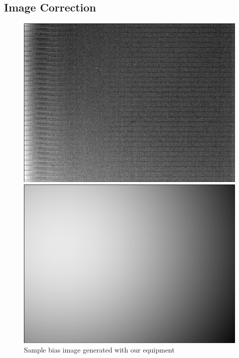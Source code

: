 \subsection{Image Correction}

\begin{figure}[ht]
    \centering
    \begin{minipage}[b]{\figwidth}
        \centering
        \includegraphics[width=\textwidth]{images/bias.png}
        \caption{Sample bias image generated with our equipment}
        \label{fig:bias_image}
    \end{minipage}\quad\quad
    \begin{minipage}[b]{\figwidth}
        \includegraphics[width=\textwidth]{images/flat.png}

\end{minipage}
\end{figure}
